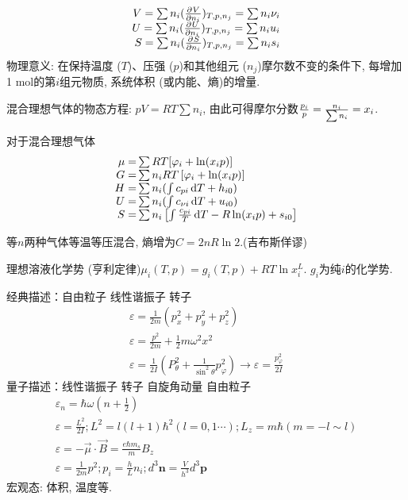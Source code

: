 \documentclass[UTF8,8pt]{ctexart}
\begin{document}
\begin{multicols}{3}
{    $$\begin{array}{rl} 
        V=\sum n_i(\frac{\partial^{} V}{\partial {n_i}^{}})_{T,p,n_j}=\sum n_i\nu_i\\
        U=\sum n_i(\frac{\partial^{} U}{\partial {n_i}^{}})_{T,p,n_j}=\sum n_iu_i\\
        S=\sum n_i(\frac{\partial^{} S}{\partial {n_i}^{}})_{T,p,n_j}=\sum n_is_i
     \end{array}$$
    物理意义: 在保持温度 ($T$)、压强 ($p$)和其他组元 ($n_j$)摩尔数不变的条件下, 每增加1 mol的第$i$组元物质, 系统体积 (或内能、熵)的增量. 
    \item 混合理想气体的物态方程: $pV= RT\sum n_i$, 由此可得摩尔分数$\frac{p_i}{p}=\frac{n_i}{\sum n_i}=x_i$. 
    \item 对于混合理想气体$$\ar{
        \mu\x \sum RT[\vp_i+\ln(x_ip)]\\
        G\x \sum n_iRT\left[\vp_i+\ln(x_ip)\right]\\
        H\x \sum n_i(\int c_{p i}\d T+h_{i0})\\
        U\x \sum n_i(\int c_{\nu i}\d T+u_{i0})\\
        S\x \sum n_i\left[\int\f{c_{pi}}{T}\d T-R\ln(x_ip)+s_{i0}\right]
    }$$
    \item 等$n$两种气体等温等压混合, 熵增为$C=2nR\ln 2$.(吉布斯佯谬)
    \item 理想溶液化学势 (亨利定律)$\mu_i(T,p)=g_i(T,p)+RT\ln x_i^L$. $g_i$为纯$i$的化学势.
    }
    经典描述：自由粒子 线性谐振子 转子
    $$ 
    \begin{array}{l}{\varepsilon=\frac{1}{2 m}\left(p_{x}^{2}+p_{y}^{2}+p_{z}^{2}\right)} \\ {\varepsilon=\frac{p^{2}}{2 m}+\frac{1}{2} m \omega^{2} x^{2}} \\ {\varepsilon=\frac{1}{2 I}\left(P_{\theta}^{2}+\frac{1}{\sin ^{2} \theta} p_{\varphi}^{2}\right) \rightarrow \varepsilon=\frac{p_{\varphi}^{2}}{2 I}}\end{array}
     $$
    量子描述：线性谐振子 转子 自旋角动量 自由粒子
    $$ 
    \begin{array}{l}
        {\varepsilon_{n}=\hbar \omega\left(n+\frac{1}{2}\right)} \\ 
        {\varepsilon=\frac{L^{2}}{2 I} ; L^{2}=l(l+1) \hbar^{2}(l=0,1\cdots) ; L_{z}=m \hbar(m=-l\sim l)} \\ 
        {\varepsilon=-\vec{\mu} \cdot \vec{B}=\frac{e \hbar m_{s}}{m} B_{z}} \\ 
        {\varepsilon=\frac{1}{2 m}p^2 ; p_{i}=\frac{h}{L} n_{i} ; d^3\bm{n}=\frac{V}{h^{3}} d^3 \bm{p}}
    \end{array}
     $$
        宏观态: 体积, 温度等. 
    

\end{multicols}
\end{document}
